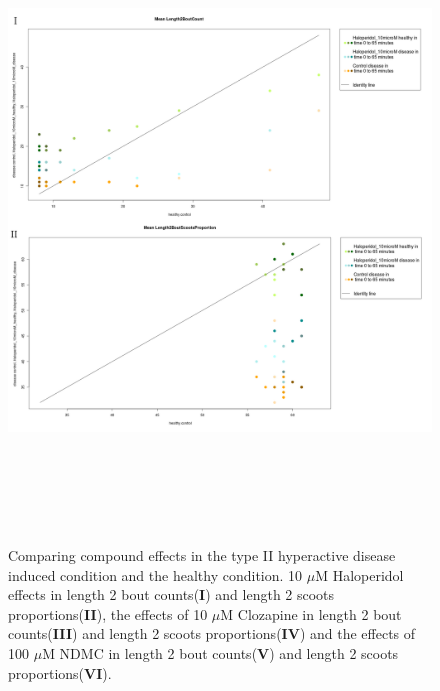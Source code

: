 \documentclass[a4paper,12pt]{article}
\begin{document}
\newpage
\begin{figure}[h!]
\begin{center}
\caption{Comparing compound effects in the type II hyperactive disease induced condition and the healthy condition. 10 $\mu$M Haloperidol effects in length 2 bout counts(\textbf{I}) and length 2 scoots proportions(\textbf{II}), the effects of 10 $\mu$M Clozapine in length 2 bout counts(\textbf{III}) and length 2 scoots proportions(\textbf{IV}) and the effects of 100 $\mu$M NDMC in length 2 bout counts(\textbf{V}) and length 2 scoots proportions(\textbf{VI}).}
\includegraphics[width=15cm,height=17cm]{PTZCountScootsH.png}
\end{center}
\end{figure}
\newpage
\end{document}
